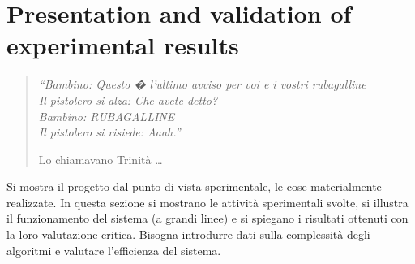\chapter{Presentation and validation of experimental results }
\label{capitolo6}
\thispagestyle{empty}

\begin{quotation}
{\footnotesize
\noindent\emph{``Bambino: Questo � l'ultimo avviso per voi e i vostri rubagalline \\
Il pistolero si alza: Che avete detto? \\
Bambino: RUBAGALLINE \\
Il pistolero si risiede: Aaah.''}
\begin{flushright}
Lo chiamavano Trinit\`a \dots
\end{flushright}
}
\end{quotation}
\vspace{0.5cm}

\noindent Si mostra il progetto dal punto di vista sperimentale, le cose materialmente realizzate. In questa sezione si mostrano le attivit\`a sperimentali svolte, si illustra il funzionamento del sistema (a grandi linee) e si spiegano i risultati ottenuti con la loro valutazione critica. Bisogna introdurre dati sulla complessit\`a degli algoritmi e valutare l'efficienza del sistema.